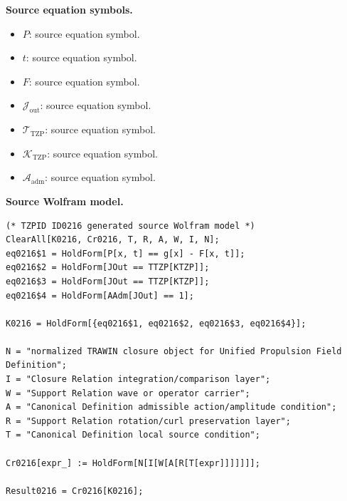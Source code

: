 \begin{minipage}[t]{0.49\linewidth}
\begingroup
\small
\raggedright
\textbf{Source equation symbols.}\par
\begin{itemize}[leftmargin=1.35em,itemsep=1pt,topsep=1pt,parsep=0pt]
    \item $P$: source equation symbol.
    \item $t$: source equation symbol.
    \item $F$: source equation symbol.
    \item $\mathcal{J}_{\mathrm{out}}$: source equation symbol.
    \item $\mathcal{T}_{\mathrm{TZP}}$: source equation symbol.
    \item $\mathcal{K}_{\mathrm{TZP}}$: source equation symbol.
    \item $\mathcal{A}_{\mathrm{adm}}$: source equation symbol.
\end{itemize}
\endgroup
\end{minipage}\hfill
\begin{minipage}[t]{0.47\linewidth}
\begingroup
\scriptsize
\raggedright
\textbf{Source Wolfram model.}\par
\begin{Verbatim}[fontsize=\tiny,breaklines=true,breakanywhere=true]
(* TZPID ID0216 generated source Wolfram model *)
ClearAll[K0216, Cr0216, T, R, A, W, I, N];
eq0216$1 = HoldForm[P[x, t] == g[x] - F[x, t]];
eq0216$2 = HoldForm[JOut == TTZP[KTZP]];
eq0216$3 = HoldForm[JOut == TTZP[KTZP]];
eq0216$4 = HoldForm[AAdm[JOut] == 1];

K0216 = HoldForm[{eq0216$1, eq0216$2, eq0216$3, eq0216$4}];

N = "normalized TRAWIN closure object for Unified Propulsion Field Definition";
I = "Closure Relation integration/comparison layer";
W = "Support Relation wave or operator carrier";
A = "Canonical Definition admissible action/amplitude condition";
R = "Support Relation rotation/curl preservation layer";
T = "Canonical Definition local source condition";

Cr0216[expr_] := HoldForm[N[I[W[A[R[T[expr]]]]]]];

Result0216 = Cr0216[K0216];
\end{Verbatim}
\endgroup
\end{minipage}

